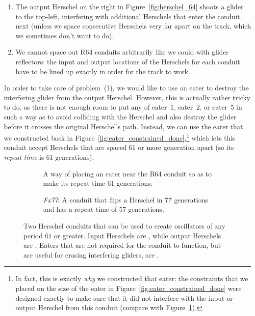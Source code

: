 \begin{enumerate}
	\item[1)] The output Herschel on the right in Figure~\ref{fig:herschel_64} shoots a glider to the top-left, interfering with additional Herschels that enter the conduit next (unless we space consecutive Herschels very far apart on the track, which we sometimes don't want to do).\smallskip
	
	\item[2)] We cannot space out R64 conduits arbitrarily like we could with glider reflectors: the input and output locations of the Herschels for each conduit have to be lined up exactly in order for the track to work.\medskip
\end{enumerate}

In order to take care of problem~(1), we would like to use an eater to destroy the interfering glider from the output Herschel. However, this is actually rather tricky to do, as there is not enough room to put any of eater~1, eater~2, or eater~5 in such a way as to avoid colliding with the Herschel and also destroy the glider before it crosses the original Herschel's path. Instead, we can use the eater that we constructed back in Figure~\ref{fig:eater_constrained_done},\footnote{In fact, this is exactly \emph{why} we constructed that eater: the constraints that we placed on the size of the eater in Figure~\ref{fig:eater_constrained_done} were designed exactly to make sure that it did not interfere with the input or output Herschel from this conduit (compare with Figure~\ref{fig:R64}).} which lets this conduit accept Herschels that are spaced 61 or more generation apart (so its \emph{repeat time} is 61 generations).

\begin{figure}[!htb]
	\centering
	\begin{subfigure}{.48\textwidth}
		\centering
		\caption{A way of placing an eater near the R64 conduit so as to make its repeat time 61 generations.}
		\label{fig:R64}
	\end{subfigure} \hfill %
	\begin{subfigure}{.48\textwidth}
		\centering
		\caption{\emph{Fx77}: A conduit that flips a Herschel in 77 generations and has a repeat time of 57 generations.}
		\label{fig:Fx77}
	\end{subfigure}
	\caption{Two Herschel conduits that can be used to create oscillators of any period $61$ or greater. Input Herschels are , while output Herschels are . Eaters that are not required for the conduit to function, but are useful for erasing interfering gliders, are .}
	\label{fig:herschel_conduits}
\end{figure}

